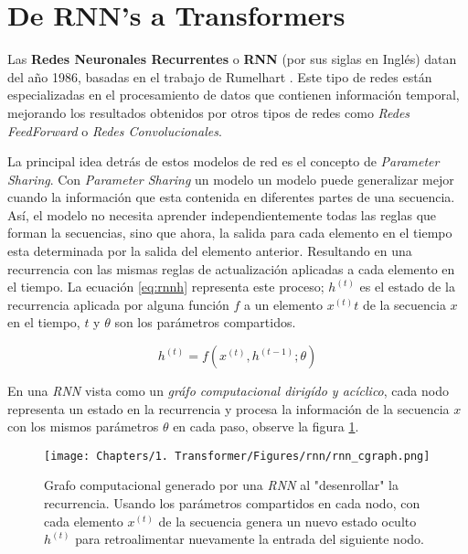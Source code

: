 \section{De RNN's a Transformers}

Las \textbf{Redes Neuronales Recurrentes} o \textbf{RNN} (por sus siglas en Inglés) datan del año
1986, basadas en el trabajo de Rumelhart \cite{Rumelhart}. Este tipo de redes están especializadas
en el procesamiento de datos que contienen información temporal, mejorando los resultados obtenidos
por otros tipos de redes como \textit{Redes FeedForward} o \textit{Redes Convolucionales}.

La principal idea detrás de estos modelos de red es el concepto de \textit{Parameter Sharing}.
Con \textit{Parameter Sharing} un modelo un modelo puede generalizar mejor cuando la información
que esta contenida en diferentes partes de una secuencia. Así, el modelo no necesita aprender
independientemente todas las reglas que forman la secuencias, sino que ahora, la salida para cada
elemento en el tiempo esta determinada por la salida del elemento anterior. Resultando en una
recurrencia con las mismas reglas de actualización aplicadas a cada elemento en el tiempo.
La ecuación \ref{eq:rnnh} representa este proceso; $h^{(t)}$ es el estado de la recurrencia aplicada
por alguna función $f$ a un elemento $x^{(t)}t$ de la secuencia $x$ en el tiempo, $t$ y $\theta$ son
los parámetros compartidos.

\begin{equation}
    h^{(t)} = f(x^{(t)}, h^{(t-1)}; \theta)
    \label{eq:rnnh}
\end{equation}

En una \textit{RNN} vista como un \textit{gráfo computacional dirigído y acíclico}, cada nodo
representa un estado en la recurrencia y procesa la información de la secuencia $x$ con los mismos
parámetros $\theta$ en cada paso, observe la figura \ref{fig:rnn_cg}.

\begin{figure}[!ht]
\centering
\texttt{[image: Chapters/1. Transformer/Figures/rnn/rnn\_cgraph.png]}
\caption[RNN - Grafo Computacional]{Grafo computacional generado por una \textit{RNN} al "desenrollar" la
recurrencia. Usando los parámetros compartidos en cada nodo, con cada elemento $x^{(t)}$ de la
secuencia genera un nuevo estado oculto $h^{(t)}$ para retroalimentar nuevamente la entrada del
siguiente nodo.}
\label{fig:rnn_cg}
\end{figure}










